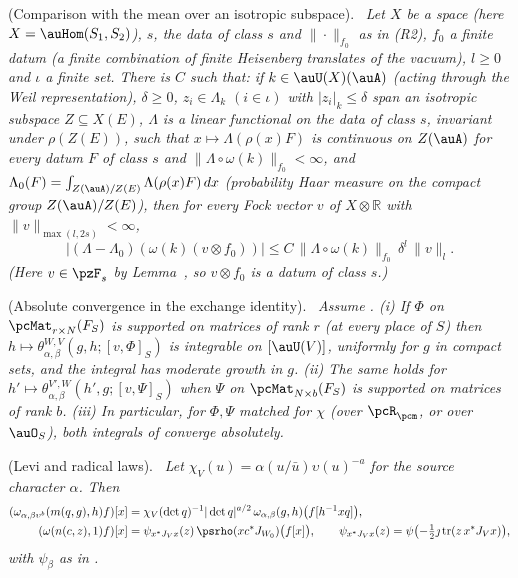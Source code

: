 \documentclass[10pt]{amsart}
\theoremstyle{definition}
\theoremstyle{remark}
\newcommand{\R}{\mathbb R}
\newenvironment{quotedthm}[2]{\par\medskip\noindent\begingroup
  \textbf{#1}#2.\ \itshape\ignorespaces}{\endgroup\par\medskip}
\begin{document}
\begin{quotedthm}{\cite[Lemma~3.32]{P53}}{ (Comparison with the mean over an isotropic subspace)}
Let $X$ be a space (here $X=\auHom(S_1,S_2)$), $s$, the data of class $s$ and $\|\cdot\|_{f_0}$ as in
\textup{(R2)}, $f_0$ a finite datum (a finite combination of finite Heisenberg translates of the
vacuum), $l\ge0$ and $\iota$ a finite set. There is $C$ such that: if $k\in\auU(X)(\auA)$ (acting
through the Weil representation), $\delta\ge0$, $z_i\in\Lambda_k$ $(i\in\iota)$ with $|z_i|_k\le\delta$
span an isotropic subspace $Z\subseteq X(E)$, $\Lambda$ is a linear functional on the data of class $s$,
invariant under $\rho(Z(E))$, such that $x\mapsto\Lambda(\rho(x)F)$ is continuous on $Z(\auA)$ for every
datum $F$ of class $s$ and $\|\Lambda\circ\omega(k)\|_{f_0}<\infty$, and
$\Lambda_0(F)=\int_{Z(\auA)/Z(E)}\Lambda(\rho(x)F)\,dx$ (probability Haar measure on the compact group
$Z(\auA)/Z(E)$), then for every Fock vector $v$ of $X\otimes\R$ with $\|v\|_{\max(l,2s)}<\infty$,
\[
|(\Lambda-\Lambda_0)(\omega(k)(v\otimes f_0))|\le C\,\|\Lambda\circ\omega(k)\|_{f_0}\,\delta^l\,\|v\|_l .
\]
(Here $v\in\pzF_s$ by Lemma~\textup{{\cite[Lemma~3.30(b)]{P53}}}, so $v\otimes f_0$ is a datum of class $s$.)
\end{quotedthm}

\begin{quotedthm}{\cite[Corollary~3.34]{P53}}{ (Absolute convergence in the exchange identity)}
Assume {\cite[Proposition~3.26]{P53}}. \textup{(i)} If $\Phi$ on $\pcMat_{r\times N}(F_S)$ is supported
on matrices of rank $r$ (at every place of $S$) then $h\mapsto\theta^{W,V}_{\alpha,\beta}(g,h;[v,\Phi]_S)$
is integrable on $[\auU(V)]$, uniformly for $g$ in compact sets, and the integral has moderate
growth in $g$. \textup{(ii)} The same holds for $h'\mapsto\theta^{V',W}_{\alpha,\beta}(h',g;[v,\Psi]_S)$
when $\Psi$ on $\pcMat_{N\times b}(F_S)$ is supported on matrices of rank $b$. \textup{(iii)} In
particular, for $\Phi,\Psi$ matched for $\chi$ (over $\pcR_\pcm$, or over $\auO_S$), both integrals of
{\cite[(12)]{P53}} converge absolutely.
\end{quotedthm}

\begin{quotedthm}{\cite[Lemma~3.62]{P53}}{ (Levi and radical laws)}
Let $\chi_V(u)=\alpha(u/\bar u)\upsilon(u)^{-a}$ for the source character $\alpha$. Then
\begin{align*}
(\omega_{\alpha,\beta\upsilon^b}(m(q,g),h)f)[x]&=\chi_V(\det q)^{-1}|\det q|^{a/2}\,
\omega_{\alpha,\beta}(g,h)\bigl(f[h^{-1}xq]\bigr),\\
(\omega(n(c,z),1)f)[x]&=\psi_{x^*J_Vx}(z)\,\psrho(x c^*J_{W_0})
\bigl(f[x]\bigr),\qquad\psi_{x^*J_Vx}(z)=\psi\bigl(-\tfrac12\jmath\operatorname{tr}(z\,x^*J_Vx)\bigr),
\end{align*}
with $\psi_\beta$ as in {\cite[(18)]{P53}}.
\end{quotedthm}
\end{document}
